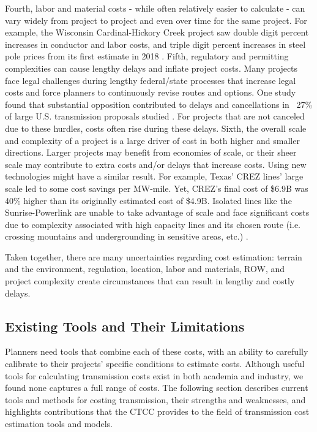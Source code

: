 \documentclass[11pt,twocolumn,a4paper]{article}
\begin{document}
Fourth,  labor and material costs - while often relatively easier to calculate - can vary widely from project to project and even over time for the same project. For example, the Wisconsin Cardinal-Hickory Creek project saw double digit percent increases in conductor and labor costs, and triple digit percent increases in steel pole prices from its first estimate in 2018 \parencite{Kaeding2023CardinalHickory}. Fifth, regulatory and permitting complexities can cause lengthy delays and inflate project costs. Many projects face legal challenges during lengthy federal/state processes that increase legal costs and force planners to continuously revise routes and options. One study found that substantial opposition contributed to delays and cancellations in ~27\% of large U.S. transmission proposals studied \parencite{BaranoffNorris2024}. For projects that are not canceled due to these hurdles, costs often rise during these delays. Sixth, the overall scale and complexity of a project is a large driver of cost in both higher and smaller directions. Larger projects may benefit from economies of scale, or their sheer scale may contribute to extra costs and/or delays that increase costs. Using new technologies might have a similar result. For example, Texas' CREZ lines' large scale led to some cost savings per MW-mile. Yet, CREZ's final cost of \$6.9B was 40\% higher than its originally estimated cost of \$4.9B. Isolated lines like the Sunrise-Powerlink are unable to take advantage of scale and face significant costs due to complexity associated with high capacity lines and its chosen route (i.e. crossing mountains and undergrounding in sensitive areas, etc.) \parencite{AndradeBaldick2017}. 


Taken together, there are many uncertainties regarding cost estimation: terrain and the environment, regulation, location, labor and materials, ROW, and project complexity create circumstances that can result in lengthy and costly delays. 

\subsection{Existing Tools and Their Limitations}
Planners need tools that combine each of these costs, with an ability to carefully calibrate to their projects' specific conditions to estimate costs. Although useful tools for calculating transmission costs exist in both academia and industry,  we found none captures a full range of costs. The following section describes current tools and methods for costing transmission, their strengths and weaknesses, and highlights contributions that the CTCC provides to the field of transmission cost estimation tools and models.
\end{document}
